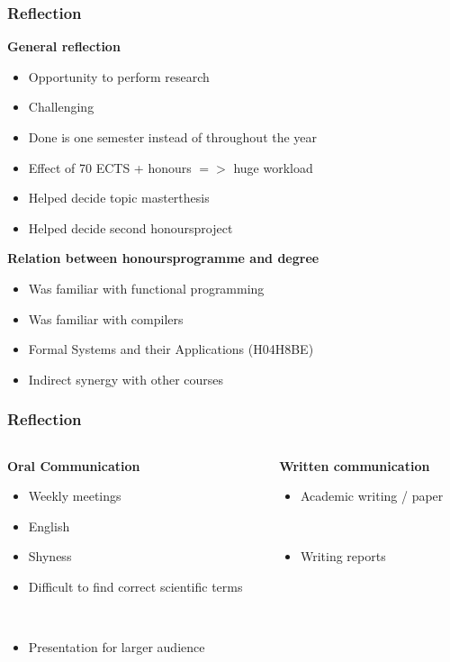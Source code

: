 \documentclass{beamer}
\begin{document}
\begin{frame}[fragile]
\frametitle{Reflection}
\textbf{General reflection}
\begin{itemize}
\item Opportunity to perform research
\item Challenging
\item Done is one semester instead of throughout the year
\item Effect of 70 ECTS + honours $=>$ huge workload
\item Helped decide topic masterthesis
\item Helped decide second honoursproject
\end{itemize}

\textbf{Relation between honoursprogramme and degree}
\begin{itemize}
\item Was familiar with functional programming
\item Was familiar with compilers
\item Formal Systems and their Applications (H04H8BE)
\item Indirect synergy with other courses
\end{itemize}
\end{frame}


\begin{frame}[fragile]
\frametitle{Reflection}

\begin{columns}[T] %
\begin{column}{.48\textwidth}

	\textbf{Oral Communication}
	\begin{itemize}
	\item Weekly meetings
	\item English
	\item Shyness
	\item Difficult to find correct scientific terms
	\end{itemize}\mbox{}\\
	\begin{itemize}
	\item Presentation for larger audience
	\end{itemize}
	
\end{column}%
\hfill%
\begin{column}{.48\textwidth}
	
	\textbf{Written communication}
	\begin{itemize}
	\item Academic writing / paper
	\end{itemize}\mbox{}\\
	\begin{itemize}
	\item Writing reports
	\end{itemize}
	
\end{column}%
\end{columns}
\end{frame}
\end{document}

